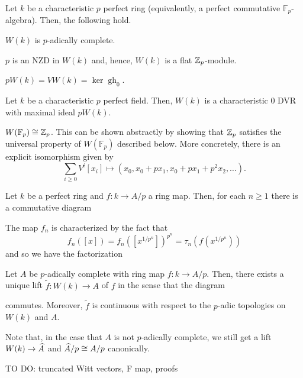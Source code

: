 \documentclass[11pt]{article}
\newcommand{\F}{\mathbb{F}}
\DeclareMathOperator{\gh}{gh}
\begin{document}
\begin{theorem}
Let $k$ be a characteristic $p$ perfect ring (equivalently, a perfect commutative $\F_p$-algebra). Then, the following hold.
\begin{enum}{\arabic}
\item $W(k)$ is $p$-adically complete.
\item $p$ is an NZD in $W(k)$ and, hence, $W(k)$ is a flat $\mathbb{Z}_p$-module.
\item $pW(k)=VW(k)=\ker\gh_0$.
\end{enum}
\end{theorem}

\begin{corollary}
Let $k$ be a characteristic $p$ perfect field. Then, $W(k)$ is a characteristic $0$ DVR with maximal ideal $pW(k)$.
\end{corollary}

\begin{example}
$W(\F_p)\iso\Z_p$. This can be shown abstractly by showing that $\mathbb{Z}_p$ satisfies the universal property of $W(\F_p)$ described below. More concretely, there is an explicit isomorphism given by 
$$\sum_{i\geq0}V^i[x_i]\mapsto(x_0,x_0+px_1,x_0+px_1+p^2x_2,\ldots).$$
\end{example}

Let $k$ be a perfect ring and $f: k\to A/p$ a ring map. Then, for each $n\geq1$ there is a commutative diagram
\begin{center}
\end{center}
The map $f_n$ is characterized by the fact that 
$$f_n([x])=f_n([x^{1/p^n}])^{p^n}=\tau_n(f(x^{1/p^n}))$$
and so we have the factorization
\begin{center}
\end{center}

\begin{corollary}
Let $A$ be $p$-adically complete with ring map $f: k\to A/p$. Then, there exists a unique lift $\tilde{f}: W(k)\to A$ of $f$ in the sense that the diagram
\begin{center}
\end{center}
commutes. Moreover, $\tilde{f}$ is continuous with respect to the $p$-adic topologies on $W(k)$ and $A$.
\end{corollary}
Note that, in the case that $A$ is not $p$-adically complete, we still get a lift $W(k)\to\widehat{A}$ and $\widehat{A}/p\cong A/p$ canonically.

TO DO: truncated Witt vectors, F map, proofs
\end{document}
